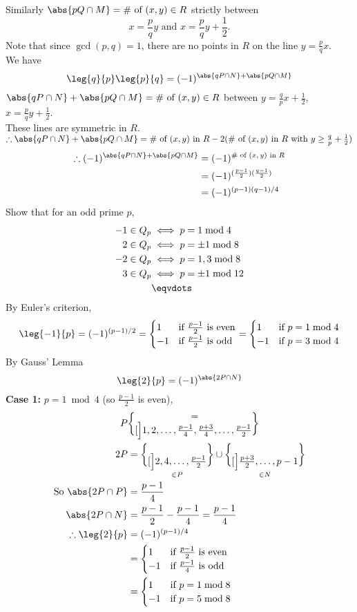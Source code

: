 Similarly $\abs{pQ\cap M}=\text{\# of $(x,y)\in R$}$ strictly between
\[ x = \frac{p}{q} y \text{ and } x = \frac{p}{q} y + \frac12 . \]
Note that since $\gcd(p,q)=1$, there are no points in $R$ on the line $y=\frac pqx$. \\
We have
\[ \leg{q}{p} \leg{p}{q} = (-1)^{\abs{qP\cap N}+\abs{pQ\cap M}} \]
$\abs{qP\cap N}+\abs{pQ\cap M}=\text{\# of $(x,y)\in R$}$ between $y=\frac{q}{p}x+\frac12$, $x=\frac{p}{q}y+\frac12$. \\
These lines are symmetric in $R$. \\
$\therefore\abs{qP\cap N}+\abs{pQ\cap M}=\text{\# of $(x,y)$ in $R$}-2(\text{\# of $(x,y)$ in $R$ with $y\geq\frac{q}{p}+\frac12$})$
\begin{align*}
\therefore(-1)^{\abs{qP\cap N}+\abs{pQ\cap M}}&=(-1)^{\text{\# of $(x,y)$ in $R$}} \\
&= (-1)^{(\frac{p-1}{2})(\frac{q-1}{2})} \\
&= (-1)^{(p-1)(q-1)/4}
\end{align*}
\eg Show that for an odd prime $p$,
\begin{align*}
-1 \in Q_p &\iff p = 1 \bmod 4 \\
2 \in Q_p &\iff p = \pm 1 \bmod 8 \\
-2 \in Q_p &\iff p = 1, 3 \bmod 8 \\
3 \in Q_p &\iff p = \pm 1 \bmod 12 \\
&\eqvdots
\end{align*}
\soln By Euler's criterion,
\[ \leg{-1}{p} = (-1)^{(p-1)/2} = \begin{cases}
1 & \text{if $\frac{p-1}{2}$ is even} \\
-1 & \text{if $\frac{p-1}{2}$ is odd}
\end{cases} = \begin{cases}
1 & \text{if $p=1\bmod4$} \\
-1 & \text{if $p=3\bmod4$}
\end{cases} \]
By Gauss' Lemma
\[ \leg{2}{p} = (-1)^{\abs{2P\cap N}} \]
\textbf{Case 1:}
$p=1\bmod4$ (so $\frac{p-1}{2}$ is even),
\begin{align*}
P&=\brace[\Big]{1,2,\dotsc,\frac{p-1}{4},\frac{p+3}{4},\dotsc,\frac{p-1}{2}} \\
2P&=\underset{\in P}{\brace[\Big]{2,4,\dotsc,\frac{p-1}{2}}}\cup\underset{\in N}{\brace[\Big]{\frac{p+3}{2},\dotsc,p-1}} \\
\text{So } \abs{2P\cap P} &= \frac{p-1}{4} \\
\abs{2P\cap N} &= \frac{p-1}{2}-\frac{p-1}{4} = \frac{p-1}{4} \\
\therefore \leg{2}{p} &= (-1)^{(p-1)/4} \\
&= \begin{cases}
1 & \text{if $\frac{p-1}{2}$ is even} \\
-1 & \text{if $\frac{p-1}{4}$ is odd}
\end{cases} \\
&= \begin{cases}
1 & \text{if $p=1\bmod8$} \\
-1 & \text{if $p=5\bmod8$}
\end{cases}
\end{align*}
